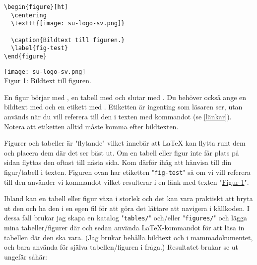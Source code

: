 \begin{multicols}{2}
\null \vfill
\noindent\begin{verbatim}
\begin{figure}[ht]
  \centering
  \texttt{[image: su-logo-sv.png]}

  \caption{Bildtext till figuren.}
  \label{fig-test}
\end{figure}
\end{verbatim}

\vfill \null
\columnbreak

{
  \centering
  \hypertarget{fig-test}{%
    \texttt{[image: su-logo-sv.png]}%
  } \\
  \vspace{.5em}
  Figur 1: Bildtext till figuren. \\ %
}
\end{multicols}

En figur börjar med , en tabell med
 och slutar med . Du behöver också
ange en bildtext med  och en etikett med
. Etiketten är ingenting som läsaren ser, utan används när du
vill referera till den i texten med kommandot  (se
\autoref{länkar}). Notera att etiketten alltid måste komma efter bildtexten.

Figurer och tabeller är "flytande" vilket innebär att \LaTeX{} kan flytta runt
dem och placera dem där det ser bäst ut. Om en tabell eller figur inte får
plats på sidan flyttas den oftast till nästa sida. Kom därför ihåg att hänvisa
till din figur/tabell i texten. Figuren ovan har etiketten "\texttt{fig-test}"
så om vi vill referera till den använder vi kommandot
 vilket resulterar i en länk med texten
"\hyperlink{fig-test}{Figur 1}".

Ibland kan en tabell eller figur växa i storlek och det kan vara praktiskt att
bryta ut den och ha den i en egen fil för att göra det lättare att navigera i
källkoden. I dessa fall brukar jag skapa en katalog "\texttt{tables/}"
och/eller "\texttt{figures/}" och lägga mina tabeller/figurer där och sedan
använda \LaTeX{}-kommandot  för att läsa in tabellen där den
ska vara. (Jag brukar behålla bildtext och  i
mammadokumentet, och bara använda  för själva
tabellen/figuren i fråga.) Resultatet brukar se ut ungefär såhär:


